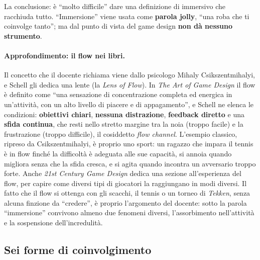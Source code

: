 La conclusione: è ``molto difficile'' dare una definizione di immersivo che
racchiuda tutto. ``Immersione'' viene usata come \textbf{parola jolly}, ``una
roba che ti coinvolge tanto''; ma dal punto di vista del game design
\textbf{non dà nessuno strumento}.

\paragraph{Approfondimento: il flow nei libri.} Il concetto che il docente
richiama viene dallo psicologo Mihaly Csikszentmihalyi, e Schell gli dedica una
lente (la \emph{Lens of Flow}). In \emph{The Art of Game Design} il flow è
definito come ``una sensazione di concentrazione completa ed energica in
un'attività, con un alto livello di piacere e di appagamento'', e Schell ne
elenca le condizioni: \textbf{obiettivi chiari}, \textbf{nessuna distrazione},
\textbf{feedback diretto} e una \textbf{sfida continua}, che resti nello
stretto margine tra la noia (troppo facile) e la frustrazione (troppo
difficile), il cosiddetto \emph{flow channel}. L'esempio classico, ripreso da
Csikszentmihalyi, è proprio uno sport: un ragazzo che impara il tennis è in
flow finché la difficoltà è adeguata alle sue capacità, si annoia quando
migliora senza che la sfida cresca, e si agita quando incontra un avversario
troppo forte. Anche \emph{21st Century Game Design} dedica una sezione
all'esperienza del flow, per capire come diversi tipi di giocatori la
raggiungano in modi diversi. Il fatto che il flow si ottenga con gli scacchi, il
tennis o un torneo di \emph{Tekken}, senza alcuna finzione da ``credere'', è
proprio l'argomento del docente: sotto la parola ``immersione'' convivono almeno
due fenomeni diversi, l'assorbimento nell'attività e la sospensione
dell'incredulità.

\subsection{Sei forme di coinvolgimento}

